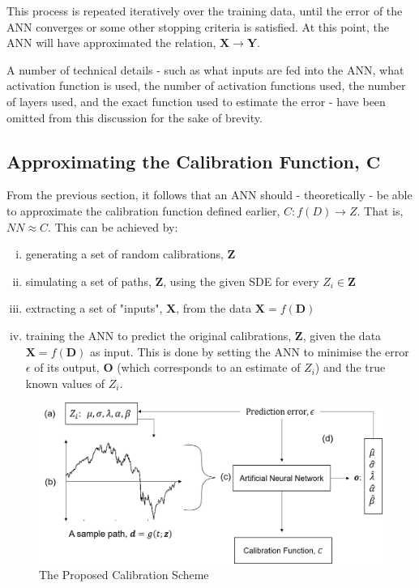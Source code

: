\documentclass[11pt,oneside,openany,a4paper,english, report, goldenblock
]{usthesis}
\begin{document}
This process is repeated iteratively over the training data, until the error of the ANN converges or some other stopping criteria is satisfied. At this point, the ANN will have approximated the relation, $\mathbf{X}\rightarrow \mathbf{Y}$.


A number of technical details - such as what inputs are fed into the ANN, what activation function is used, the number of activation functions used, the number of layers used, and the exact function used to estimate the error - have been omitted from this discussion for the sake of brevity. 

\subsection{Approximating the Calibration Function, $\mathbf{C}$}
From the previous section, it follows that an ANN should - theoretically - be able to approximate the calibration function defined earlier, $C: f \left( D \right) \rightarrow Z$. That is, $NN \approx C$.
This can be achieved by:
\begin{enumerate}[i)]
	\itemsep0em 
	
	\item generating a set of random calibrations, $\mathbf{Z}$
	
	\item simulating a set of paths,  $\mathbf{Z}$, using the given SDE for every  $Z_i \in \mathbf{Z}$
	
	\item extracting a set of "inputs", $\mathbf{X}$, from the data $\mathbf{X} = f\left(\mathbf{D}\right)$
	
	\item training the ANN to predict the original calibrations, $\mathbf{Z}$, given the data $\mathbf{X}=f \left( \mathbf{D} \right)$ as input. This is done by setting the ANN to minimise the error $\epsilon$ of its output, $\mathbf{O}$ (which corresponds to an estimate of $Z_i$) and the true known values of $Z_i$.
	
	
\end{enumerate}

\begin{figure}[h]
	\centering
	\includegraphics[width=1\linewidth]{CalibrationSchemeDiagram}
	\caption[The Proposed Calibration Scheme]{The Proposed Calibration Scheme}
	\label{fig:calibrationschemediagram}
\end{figure}
\end{document}
